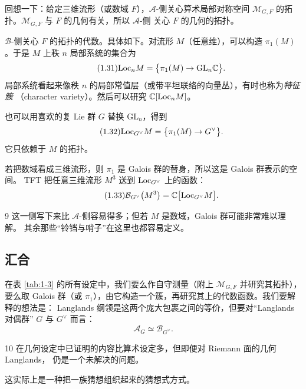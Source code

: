 
回想一下：给定三维流形（或数域 $F$），$\mathcal{A}$-侧关心算术局部对称空间
$\mathcal{M}_{G,F}$ 的拓扑。$\mathcal{M}_{G,F}$ 与 $F$ 的几何有关，所以 $\mathcal{A}$-侧
关心 $F$ 的几何的拓扑。

$\mathcal{B}$-侧关心 $F$ 的拓扑的代数。具体如下。对流形 $M$（任意维），可以构造
$\pi_1(M)$。于是 $M$ 上秩 $n$ 局部系统的集合为
\begin{equation}\tag{1.31}\label{eq:1.31}
\mathrm{Loc}_n M=\bigl\{\pi_1(M)\to\mathrm{GL}_n\mathbb{C}\bigr\}.
\end{equation}
局部系统看起来像秩 $n$ 的局部常值层（或带平坦联络的向量丛），有时也称为\emph{特征簇}
（character variety）。然后可以研究 $\mathbb{C}[\mathrm{Loc}_n M]$。

也可以用喜欢的复 Lie 群 $G$ 替换 $\mathrm{GL}_n$，得到
\begin{equation}\tag{1.32}\label{eq:1.32}
\mathrm{Loc}_{G^{\vee}}M=\bigl\{\pi_1(M)\to G^{\vee}\bigr\}.
\end{equation}
它只依赖于 $M$ 的拓扑。

若把数域看成三维流形，则 $\pi_1$ 是 Galois 群的替身，所以这是 Galois 群表示的空间。
TFT 把任意三维流形 $M^3$ 送到 $\mathrm{Loc}_{G^{\vee}}$ 上的函数：
\begin{equation}\tag{1.33}\label{eq:1.33}
\mathcal{B}_{G^{\vee}}\bigl(M^3\bigr)=\mathbb{C}\bigl[\mathrm{Loc}_{G^{\vee}}M\bigr].
\end{equation}

\begin{srcrem}{9}
这一侧写下来比 $\mathcal{A}$-侧容易得多；但若 $M$ 是数域，Galois 群可能非常难以理解。
其余那些“铃铛与哨子”在这里也都容易定义。
\end{srcrem}

\subsection{汇合}

在表 \ref{tab:1-3} 的所有设定中，我们要么作自守测量（附上 $\mathcal{M}_{G,F}$ 并研究其拓扑），
要么取 Galois 群（或 $\pi_1$），由它构造一个簇，再研究其上的代数函数。我们要解释的想法是：
Langlands 纲领是这两个庞大包裹之间的等价，但要对“Langlands 对偶群” $G$ 与 $G^{\vee}$ 而言：
\begin{equation}\tag{1.34}\label{eq:1.34}
\mathcal{A}_G\simeq\mathcal{B}_{G^{\vee}}.
\end{equation}

\begin{srcrem}{10}
在几何设定中已证明的内容比算术设定多，但即便对 Riemann 面的几何 Langlands，
仍是一个未解决的问题。
\end{srcrem}

这实际上是一种把一族猜想组织起来的猜想式方式。
